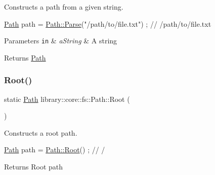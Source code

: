 Constructs a path from a given string. 


\begin{DoxyCode}
\hyperlink{classlibrary_1_1core_1_1fs_1_1Path_aaba9a8e0153813f08f78f1c3275734a4}{Path} path = \hyperlink{classlibrary_1_1core_1_1fs_1_1Path_aebf5bd3af83e0b7376616e146f3e55df}{Path::Parse}(\textcolor{stringliteral}{"/path/to/file.txt"}) ; \textcolor{comment}{// /path/to/file.txt}
\end{DoxyCode}



\begin{DoxyParams}[1]{Parameters}
\mbox{\tt in}  & {\em a\+String} & A string \\
\hline
\end{DoxyParams}
\begin{DoxyReturn}{Returns}
\hyperlink{classlibrary_1_1core_1_1fs_1_1Path}{Path} 
\end{DoxyReturn}
\mbox{\label{classlibrary_1_1core_1_1fs_1_1Path_aa7276f3f578b7ebc40bb0fba7e9c2750}} 
\subsubsection{\texorpdfstring{Root()}{Root()}}
{\footnotesize\ttfamily static \hyperlink{classlibrary_1_1core_1_1fs_1_1Path}{Path} library\+::core\+::fs\+::\+Path\+::\+Root (\begin{DoxyParamCaption}{ }\end{DoxyParamCaption})\hspace{0.3cm}{\ttfamily [static]}}



Constructs a root path. 


\begin{DoxyCode}
\hyperlink{classlibrary_1_1core_1_1fs_1_1Path_aaba9a8e0153813f08f78f1c3275734a4}{Path} path = \hyperlink{classlibrary_1_1core_1_1fs_1_1Path_aa7276f3f578b7ebc40bb0fba7e9c2750}{Path::Root}() ; \textcolor{comment}{// /}
\end{DoxyCode}


\begin{DoxyReturn}{Returns}
Root path 
\end{DoxyReturn}
\mbox{\label{classlibrary_1_1core_1_1fs_1_1Path_a8b5672cb98f78457824137454065897c}} 
